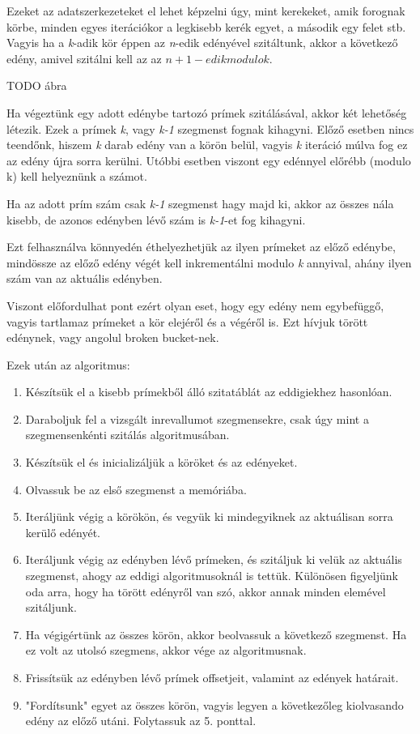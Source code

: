 \documentclass[twoside, a4paper, 12pt]{article}
\begin{document}
Ezeket az adatszerkezeteket el lehet képzelni úgy, mint kerekeket, amik forognak körbe, minden egyes iterációkor a legkisebb kerék egyet, a második egy felet stb. Vagyis ha a \textit{k}-adik kör éppen az \textit{n}-edik edényével szitáltunk, akkor a következő edény, amivel szitálni kell az az $n+1-edik modulo k$. \par
TODO ábra \par
Ha végeztünk egy adott edénybe tartozó prímek szitálásával, akkor két lehetőség létezik. Ezek a prímek \textit{k}, vagy \textit{k-1} szegmenst fognak kihagyni. Előző esetben nincs teendőnk, hiszem \textit{k} darab edény van a körön belül, vagyis \textit{k} iteráció múlva fog ez az edény újra sorra kerülni. Utóbbi esetben viszont egy edénnyel előrébb (modulo k) kell helyeznünk a számot.
\begin{theorem}
Ha az adott prím szám csak \textit{k-1} szegmenst hagy majd ki, akkor az összes nála kisebb, de azonos edényben lévő szám is \textit{k-1}-et fog kihagyni.
\end{theorem}
Ezt felhasználva könnyedén éthelyezhetjük az ilyen prímeket az előző edénybe, mindössze az előző edény végét kell inkrementálni modulo \textit{k} annyival, ahány ilyen szám van az aktuális edényben. \par
Viszont előfordulhat pont ezért olyan eset, hogy egy edény nem egybefüggő, vagyis tartlamaz prímeket a kör elejéről és a végéről is. Ezt hívjuk törött edénynek, vagy angolul broken bucket-nek. \par
\bigskip
Ezek után az algoritmus:
\begin{enumerate}
\item Készítsük el a kisebb prímekből álló szitatáblát az eddigiekhez hasonlóan.
\item Daraboljuk fel a vizsgált inrevallumot szegmensekre, csak úgy mint a szegmensenkénti szitálás algoritmusában.
\item Készítsük el és inicializáljük a köröket és az edényeket.
\item Olvassuk be az első szegmenst a memóriába.
\item Iteráljünk végig a körökön, és vegyük ki mindegyiknek az aktuálisan sorra kerülő edényét.
\item Iteráljunk végig az edényben lévő prímeken, és szitáljuk ki velük az aktuális szegmenst, ahogy az eddigi algoritmusoknál is tettük. Különösen figyeljünk oda arra, hogy ha törött edényről van szó, akkor annak minden elemével szitáljunk.
\item Ha végigértünk az összes körön, akkor beolvassuk a következő szegmenst. Ha ez volt az utolsó szegmens, akkor vége az algoritmusnak.
\item Frissítsük az edényben lévő prímek offsetjeit, valamint az edények határait.
\item "Fordítsunk" egyet az összes körön, vagyis legyen a következőleg kiolvasando edény az előző utáni. Folytassuk az 5. ponttal.
\end{enumerate}
\end{document}
